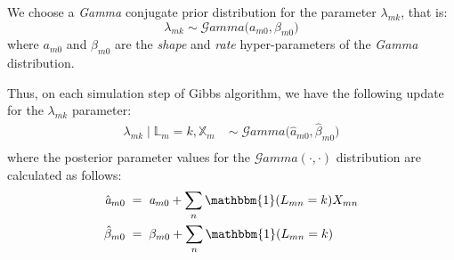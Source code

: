 We choose a \emph{Gamma} conjugate prior distribution for the parameter $\lambda_{mk}$, that is:
\begin{equation}
	\lambda_{mk} \sim \mathcal{G}amma\big(\mathit{a}_{m0}, \beta_{m0}\big)
\end{equation}
where $\mathit{a}_{m0}$ and $\beta_{m0}$ are the \emph{shape} and \emph{rate} hyper-parameters of the \emph{Gamma} distribution.

Thus, on each simulation step of Gibbs algorithm, we have the following update for the $\lambda_{mk}$ parameter:
\begin{equation}
  \begin{aligned}
  	\lambda_{mk} \mid \mathbb{L}_{m}=k, \mathbb{X}_{m} \;& \sim \;\mathcal{G}amma\big(\hat{\mathit{a}}_{m0}, \hat{\beta}_{m0}\big) \\
  \end{aligned}
\end{equation}
where the posterior parameter values for the $\mathcal{G}amma(\cdot,\cdot)$ distribution are calculated as follows:
\begin{equation}
  \begin{aligned}
  	\hat{\mathit{a}}_{m0} \; &= \; \mathit{a}_{m0} + \sum_{n}\mathbbm{1}(L_{mn}=k)X_{mn} \\
  	\hat{\beta}_{m0} \; &= \; \beta_{m0} +  \sum_{n}\mathbbm{1}(L_{mn}=k)
  \end{aligned}
\end{equation}
